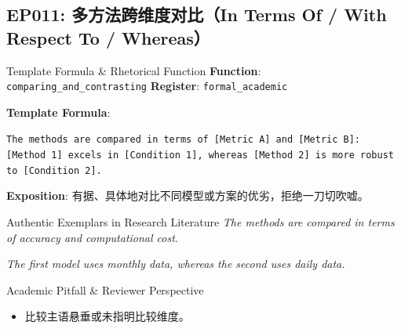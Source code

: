 \subsection{EP011: 多方法跨维度对比（In Terms Of / With Respect To / Whereas）}\label{sec:ep:EP011}
\begin{ConceptBox}{Template Formula \& Rhetorical Function}
\textbf{Function}: \texttt{comparing\_and\_contrasting} \quad \textbf{Register}: \texttt{formal\_academic}\par\vspace{3pt}
\textbf{Template Formula}:\par\noindent\texttt{The methods are compared in terms of [Metric A] and [Metric B]: [Method 1] excels in [Condition 1], whereas [Method 2] is more robust to [Condition 2].}\par\vspace{4pt}
\textbf{Exposition}: 有据、具体地对比不同模型或方案的优劣，拒绝一刀切吹嘘。
\end{ConceptBox}
\begin{ExampleBox}{Authentic Exemplars in Research Literature}
\textit{The methods are compared in terms of accuracy and computational cost.}\par\vspace{2pt}
\textit{The first model uses monthly data, whereas the second uses daily data.}\par\vspace{2pt}
\end{ExampleBox}
\begin{TipBox}{Academic Pitfall \& Reviewer Perspective}
\begin{itemize}[leftmargin=1.5em, itemsep=1pt]
  \item 比较主语悬垂或未指明比较维度。
\end{itemize}
\end{TipBox}
\vspace{6pt}

